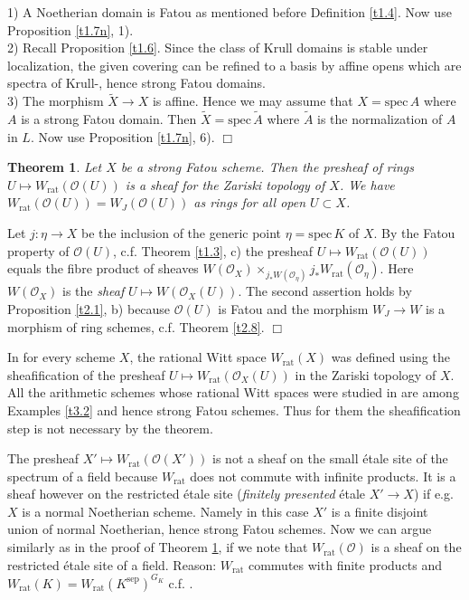 \documentclass[12pt,leqno]{article}
\newcommand{\spec}{\mathrm{spec}\,}
\newcommand{\rat}{\mathrm{rat}}
\newcommand{\sep}{\mathrm{sep}}
\newcommand{\Oh}{{\mathcal O}}
\newcommand{\tA}{\tilde{A}}
\newtheorem{theorem}{Theorem}[section]
\newenvironment{rem}{\noindent {\bf Remark}}{}
\newenvironment{proof}{\noindent {\bf Proof}}{\mbox{}\hspace*{\fill}$\Box$}
\newcommand{\tX}{\tilde{X}}
\begin{document}
\begin{proof}
1) A Noetherian domain is Fatou as mentioned before Definition \ref{t1.4}. Now use Proposition \ref{t1.7n}, 1).\\
2) Recall Proposition \ref{t1.6}. Since the class of Krull domains is stable under localization, the given covering can be refined to a basis by affine opens which are spectra of Krull-, hence strong Fatou domains.\\
3) The morphism $\tX \to X$ is affine. Hence we may assume that $X = \spec A$ where $A$ is a strong Fatou domain. Then $\tX = \spec \tA$ where $\tA$ is the normalization of $A$ in $L$. Now use Proposition \ref{t1.7n}, 6).  
\end{proof}

\begin{theorem}
\label{t3.3}
Let $X$ be a strong Fatou scheme. Then the presheaf of rings $U \mapsto W_{\rat} (\Oh (U))$ is a sheaf for the Zariski topology of $X$. We have $W_{\rat} (\Oh (U)) = W_J (\Oh (U))$ as rings for all open $U \subset X$. 
\end{theorem}

\begin{proof}
Let $j : \eta \to X$ be the inclusion of the generic point $\eta = \spec K$ of $X$. By the Fatou property of $\Oh (U)$, c.f. Theorem \ref{t1.3}, c) the presheaf $U \mapsto W_{\rat} (\Oh (U))$ equals the fibre product of sheaves $W (\Oh_X) \times_{j_* W (\Oh_{\eta})} j_* W_{\rat} (\Oh_{\eta})$. Here $W (\Oh_X)$ is the \textit{sheaf} $U \mapsto W (\Oh_X (U))$. The second assertion holds by Proposition \ref{t2.1}, b) because $\Oh (U)$ is Fatou and the morphism $W_J \to W$ is a morphism of ring schemes, c.f. Theorem \ref{t2.8}.
\end{proof}

\begin{rem}
In \cite[\S\,2]{D} for every scheme $X$, the rational Witt space $W_{\rat} (X)$ was defined using the sheafification of the presheaf $U \mapsto W_{\rat} (\Oh_X (U))$ in the Zariski topology of $X$. All the arithmetic schemes whose rational Witt spaces were studied in \cite{D} are among Examples \ref{t3.2} and hence strong Fatou schemes. Thus for them the sheafification step is not necessary by the theorem. 
\end{rem}

\begin{rem}
The presheaf $X' \mapsto W_{\rat} (\Oh (X'))$ is not a sheaf on the small \'etale site of the spectrum of a field because $W_{\rat}$ does not commute with infinite products. It is a sheaf however on the restricted \'etale site (\textit{finitely presented} \'etale $X' \to X$) if e.g. $X$ is a normal Noetherian scheme. Namely in this case $X'$ is a finite disjoint union of normal Noetherian, hence strong Fatou schemes. Now we can argue similarly as in the proof of Theorem \ref{t3.3}, if we note that $W_{\rat} (\Oh)$ is a sheaf on the restricted \'etale site of a field. Reason: $W_{\rat}$ commutes with finite products and $W_{\rat} (K) = W_{\rat} (K^{\sep})^{G_K}$ c.f. \cite[Proposition 1.3]{D}. 
\end{rem}
\end{document}
